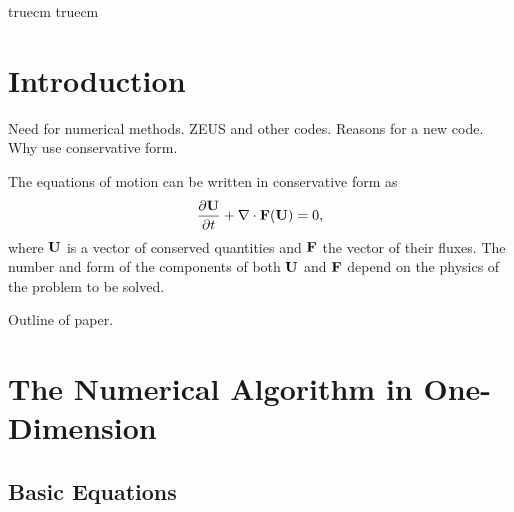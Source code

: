 \nonstopmode
{}
\setlength{\textheight}{9.0in}
\setlength{\textwidth}{6.5in}
 truecm
 truecm


\newcommand{\Dt}[0]{\bigtriangleup t}
\newcommand{\Dx}[0]{\bigtriangleup x}
\makeatletter                                            %
\def\plotone#1{\centering \leavevmode                    %
\epsfxsize=\columnwidth \epsfbox{#1}}                    %
\def\plotone_reduction#1#2{\centering \leavevmode        %
\epsfxsize=#2\columnwidth \epsfbox{#1}}                  %
\def\plottwo#1#2{\centering \leavevmode                  %
\epsfxsize=.45\columnwidth \epsfbox{#1} \hfil            %
\epsfxsize=.45\columnwidth \epsfbox{#2}}                 %
\def\plotfiddle#1#2#3#4#5#6#7{\centering \leavevmode     %
\vbox to#2{\rule{0pt}{#2}}                               %
\special{psfile=#1 voffset=#7 hoffset=#6 vscale=#5 hscale=#4 angle=#3}} %
\makeatother



\section{Introduction}

Need for numerical methods.  ZEUS and other codes.  Reasons for a new code.
Why use conservative form.

The equations of motion can be written in conservative form as
\begin{equation}
\frac{\partial {\bf U}}{\partial t} + 
   {\bf \nabla} \cdot {\bf F}({\bf U}) = 0,
\end{equation}
where ${\bf U}$ is a vector of conserved quantities and ${\bf F}$ the vector
of their fluxes.  The number and form of the components of both ${\bf U}$
and ${\bf F}$ depend on the physics of the problem to be solved.  

Outline of paper.

\section{The Numerical Algorithm in One-Dimension}

\subsection{Basic Equations}

